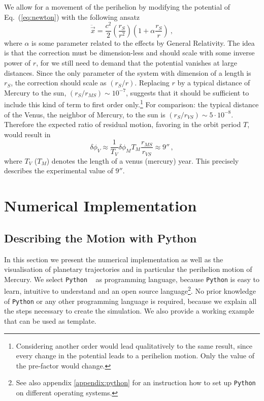 \documentclass[12pt]{iopart}
\newcommand{\python}[0]{\texttt{Python} }
\begin{document}
We allow for a movement of the perihelion by modifying the potential of Eq.~(\ref{eq:newton}) with the following ansatz
\begin{equation}
\ddot{\vec x} = \frac{c^2}{2}\left(\frac{r_S}{r^2}\right)\left(1+\alpha\frac{r_S}{r}\right) \ ,
\label{eq:newton_art}
\end{equation}
where $\alpha$ is some parameter related to the effects by General Relativity.
The idea is that the correction must be dimension-less and should scale with some inverse power of $r$, for we still need to demand that the potential vanishes at large distances.
Since the only parameter of the system with dimension of a length is $r_S$, the correction should scale as $(r_S/r)$.
Replacing $r$ by a typical distance of Mercury to the sun, $(r_S/r_{MS})\sim 10^{-7}$, suggests that it should be sufficient to include this kind of term to first order only.\footnote{Considering another order would lead qualitatively to the same result, since every change in the potential leads to a perihelion motion. Only the value of the pre-factor would change.}
For comparison: the typical distance of the Venus, the neighbor of Mercury, to the sun is $(r_S/r_{VS}) \sim 5 \cdot 10^{-8}$.
Therefore the expected ratio of residual motion, favoring in the orbit period $T$, would result in
\begin{equation}
	\delta \phi_V \approx \frac{1}{T_V} \delta \phi_M T_M \frac{r_{MS}}{r_{VS}} \approx 9'' \, ,
\end{equation}
where $T_V$ ($T_M$) denotes the length of a venus (mercury) year. This precisely describes the experimental value of $9''$.



\section{Numerical Implementation}\label{sec:Numerical Implementation}

\subsection{Describing the Motion with Python}

In this section we present the numerical implementation as well as the visualisation of planetary trajectories and in
particular
the perihelion motion of Mercury.  We select \python~\cite{} as  programming language, because \python is easy to learn, 
intuitive to understand and an open source language\footnote{See also appendix \ref{appendix:python} for an instruction 
how to set up \python on different operating systems.}.  No prior knowledge of \python or any other programming language 
is required, because we explain all the steps necessary to create the simulation.  We also provide a working 
example \cite{}
%
 that can be used as template.
%
\end{document}
